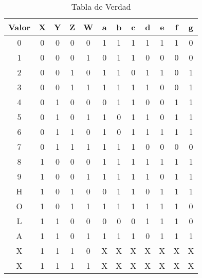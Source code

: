     \begin{table}[H]
      \begin{center}
        \begin{tabular}{ c ||| c  c  c  c ||| c | c | c | c | c | c | c}
          \toprule
          Valor & X & Y & Z & W & a & b & c & d & e & f & g \\
          \toprule
          0    &    0 & 0 & 0 & 0    &    1 & 1 & 1 & 1 & 1 & 1 & 0 \\
          1    &    0 & 0 & 0 & 1    &    0 & 1 & 1 & 0 & 0 & 0 & 0 \\
          2    &    0 & 0 & 1 & 0    &    1 & 1 & 0 & 1 & 1 & 0 & 1 \\
          3    &    0 & 0 & 1 & 1    &    1 & 1 & 1 & 1 & 0 & 0 & 1 \\
          \midrule
          4    &    0 & 1 & 0 & 0    &    0 & 1 & 1 & 0 & 0 & 1 & 1 \\
          5    &    0 & 1 & 0 & 1    &    1 & 0 & 1 & 1 & 0 & 1 & 1 \\
          6    &    0 & 1 & 1 & 0    &    1 & 0 & 1 & 1 & 1 & 1 & 1 \\
          7    &    0 & 1 & 1 & 1    &    1 & 1 & 1 & 0 & 0 & 0 & 0 \\
          \midrule
          8    &    1 & 0 & 0 & 0    &    1 & 1 & 1 & 1 & 1 & 1 & 1 \\
          9    &    1 & 0 & 0 & 1    &    1 & 1 & 1 & 1 & 0 & 1 & 1 \\
          H    &    1 & 0 & 1 & 0    &    0 & 1 & 1 & 0 & 1 & 1 & 1 \\
          O    &    1 & 0 & 1 & 1    &    1 & 1 & 1 & 1 & 1 & 1 & 0 \\
          \midrule
          L    &    1 & 1 & 0 & 0    &    0 & 0 & 0 & 1 & 1 & 1 & 0 \\
          A    &    1 & 1 & 0 & 1    &    1 & 1 & 1 & 0 & 1 & 1 & 1 \\
          X    &    1 & 1 & 1 & 0    &    X & X & X & X & X & X & X \\
          X    &    1 & 1 & 1 & 1    &    X & X & X & X & X & X & X \\
          \bottomrule
        \end{tabular}
        \label{tab:verdad}
        \caption{Tabla de Verdad}
      \end{center}
    \end{table}

